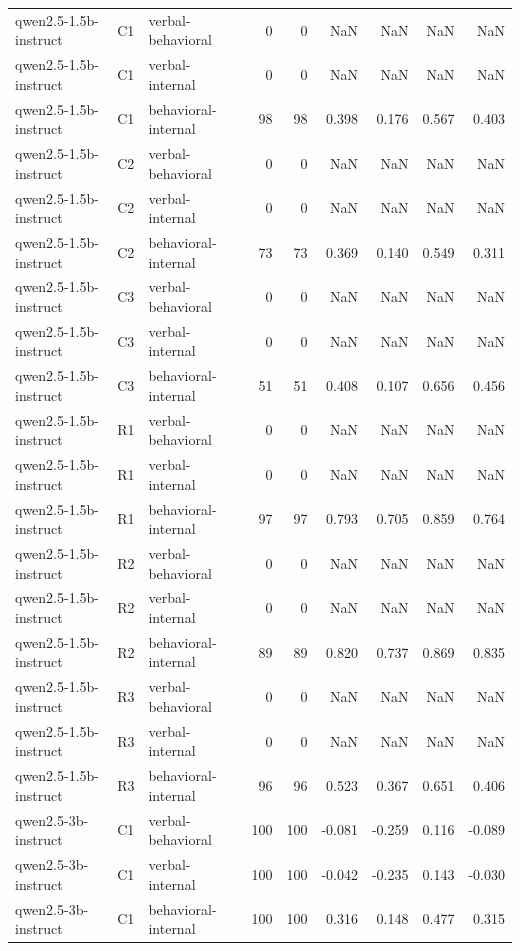 \begin{table}
\begin{tabular}{lllrrrrrr}
qwen2.5-1.5b-instruct & C1 & verbal-behavioral & 0 & 0 & NaN & NaN & NaN & NaN \\
qwen2.5-1.5b-instruct & C1 & verbal-internal & 0 & 0 & NaN & NaN & NaN & NaN \\
qwen2.5-1.5b-instruct & C1 & behavioral-internal & 98 & 98 & 0.398 & 0.176 & 0.567 & 0.403 \\
qwen2.5-1.5b-instruct & C2 & verbal-behavioral & 0 & 0 & NaN & NaN & NaN & NaN \\
qwen2.5-1.5b-instruct & C2 & verbal-internal & 0 & 0 & NaN & NaN & NaN & NaN \\
qwen2.5-1.5b-instruct & C2 & behavioral-internal & 73 & 73 & 0.369 & 0.140 & 0.549 & 0.311 \\
qwen2.5-1.5b-instruct & C3 & verbal-behavioral & 0 & 0 & NaN & NaN & NaN & NaN \\
qwen2.5-1.5b-instruct & C3 & verbal-internal & 0 & 0 & NaN & NaN & NaN & NaN \\
qwen2.5-1.5b-instruct & C3 & behavioral-internal & 51 & 51 & 0.408 & 0.107 & 0.656 & 0.456 \\
qwen2.5-1.5b-instruct & R1 & verbal-behavioral & 0 & 0 & NaN & NaN & NaN & NaN \\
qwen2.5-1.5b-instruct & R1 & verbal-internal & 0 & 0 & NaN & NaN & NaN & NaN \\
qwen2.5-1.5b-instruct & R1 & behavioral-internal & 97 & 97 & 0.793 & 0.705 & 0.859 & 0.764 \\
qwen2.5-1.5b-instruct & R2 & verbal-behavioral & 0 & 0 & NaN & NaN & NaN & NaN \\
qwen2.5-1.5b-instruct & R2 & verbal-internal & 0 & 0 & NaN & NaN & NaN & NaN \\
qwen2.5-1.5b-instruct & R2 & behavioral-internal & 89 & 89 & 0.820 & 0.737 & 0.869 & 0.835 \\
qwen2.5-1.5b-instruct & R3 & verbal-behavioral & 0 & 0 & NaN & NaN & NaN & NaN \\
qwen2.5-1.5b-instruct & R3 & verbal-internal & 0 & 0 & NaN & NaN & NaN & NaN \\
qwen2.5-1.5b-instruct & R3 & behavioral-internal & 96 & 96 & 0.523 & 0.367 & 0.651 & 0.406 \\
qwen2.5-3b-instruct & C1 & verbal-behavioral & 100 & 100 & -0.081 & -0.259 & 0.116 & -0.089 \\
qwen2.5-3b-instruct & C1 & verbal-internal & 100 & 100 & -0.042 & -0.235 & 0.143 & -0.030 \\
qwen2.5-3b-instruct & C1 & behavioral-internal & 100 & 100 & 0.316 & 0.148 & 0.477 & 0.315 \\

\end{tabular}
\end{table}
